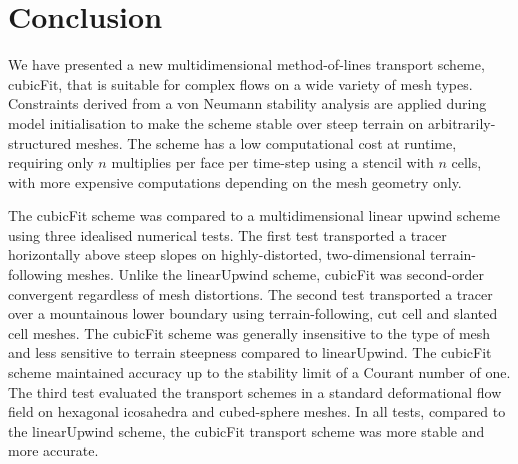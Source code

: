 \section{Conclusion}
\label{sec:conclusion}

We have presented a new multidimensional method-of-lines transport scheme, cubicFit, that is suitable for complex flows on a wide variety of mesh types.  Constraints derived from a von Neumann stability analysis are applied during model initialisation to make the scheme stable over steep terrain on arbitrarily-structured meshes.
The scheme has a low computational cost at runtime, requiring only $n$ multiplies per face per time-step using a stencil with $n$ cells, with more expensive computations depending on the mesh geometry only.

The cubicFit scheme was compared to a multidimensional linear upwind scheme using three idealised numerical tests.
The first test transported a tracer horizontally above steep slopes on highly-distorted, two-dimensional terrain-following meshes.  Unlike the linearUpwind scheme, cubicFit was second-order convergent regardless of mesh distortions.
The second test transported a tracer over a mountainous lower boundary using terrain-following, cut cell and slanted cell meshes.
The cubicFit scheme was generally insensitive to the type of mesh and less sensitive to terrain steepness compared to linearUpwind.  The cubicFit scheme maintained accuracy up to the stability limit of a Courant number of one.
The third test evaluated the transport schemes in a standard deformational flow field on hexagonal icosahedra and cubed-sphere meshes.
In all tests, compared to the linearUpwind scheme, the cubicFit transport scheme was more stable and more accurate.

